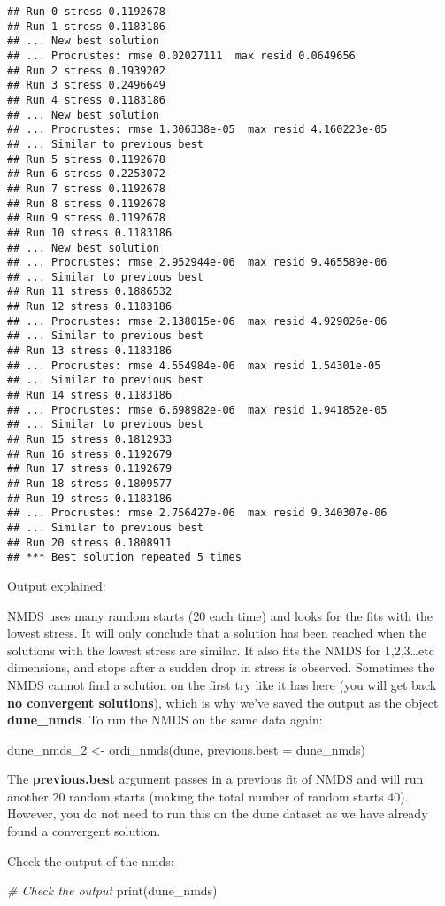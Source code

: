 \documentclass[
]{article}
\newenvironment{Shaded}{\begin{snugshade}}{\end{snugshade}}
\newcommand{\CommentTok}[1]{\textcolor[rgb]{0.56,0.35,0.01}{\textit{#1}}}
\newcommand{\FunctionTok}[1]{\textcolor[rgb]{0.00,0.00,0.00}{#1}}
\newcommand{\NormalTok}[1]{#1}
\begin{document}
\begin{verbatim}
## Run 0 stress 0.1192678 
## Run 1 stress 0.1183186 
## ... New best solution
## ... Procrustes: rmse 0.02027111  max resid 0.0649656 
## Run 2 stress 0.1939202 
## Run 3 stress 0.2496649 
## Run 4 stress 0.1183186 
## ... New best solution
## ... Procrustes: rmse 1.306338e-05  max resid 4.160223e-05 
## ... Similar to previous best
## Run 5 stress 0.1192678 
## Run 6 stress 0.2253072 
## Run 7 stress 0.1192678 
## Run 8 stress 0.1192678 
## Run 9 stress 0.1192678 
## Run 10 stress 0.1183186 
## ... New best solution
## ... Procrustes: rmse 2.952944e-06  max resid 9.465589e-06 
## ... Similar to previous best
## Run 11 stress 0.1886532 
## Run 12 stress 0.1183186 
## ... Procrustes: rmse 2.138015e-06  max resid 4.929026e-06 
## ... Similar to previous best
## Run 13 stress 0.1183186 
## ... Procrustes: rmse 4.554984e-06  max resid 1.54301e-05 
## ... Similar to previous best
## Run 14 stress 0.1183186 
## ... Procrustes: rmse 6.698982e-06  max resid 1.941852e-05 
## ... Similar to previous best
## Run 15 stress 0.1812933 
## Run 16 stress 0.1192679 
## Run 17 stress 0.1192679 
## Run 18 stress 0.1809577 
## Run 19 stress 0.1183186 
## ... Procrustes: rmse 2.756427e-06  max resid 9.340307e-06 
## ... Similar to previous best
## Run 20 stress 0.1808911 
## *** Best solution repeated 5 times
\end{verbatim}

Output explained:

NMDS uses many random starts (20 each time) and looks for the fits with
the lowest stress. It will only conclude that a solution has been
reached when the solutions with the lowest stress are similar. It also
fits the NMDS for 1,2,3\ldots etc dimensions, and stops after a sudden
drop in stress is observed. Sometimes the NMDS cannot find a solution on
the first try like it has here (you will get back \textbf{no convergent
solutions}), which is why we've saved the output as the object
\textbf{dune\_nmds}. To run the NMDS on the same data again:

dune\_nmds\_2 \textless- ordi\_nmds(dune, previous.best = dune\_nmds)

The \textbf{previous.best} argument passes in a previous fit of NMDS and
will run another 20 random starts (making the total number of random
starts 40). However, you do not need to run this on the dune dataset as
we have already found a convergent solution.

Check the output of the nmds:

\begin{Shaded}
\begin{Highlighting}[]
\CommentTok{\# Check the output}
\FunctionTok{print}\NormalTok{(dune\_nmds)}
\end{Highlighting}
\end{Shaded}
\end{document}
